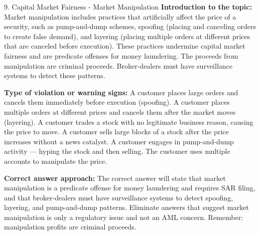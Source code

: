 \documentclass[11pt,a4paper]{beamer}
\begin{document}
\begin{frame}{9. Capital Market Fairness - Market Manipulation}
\tiny
\noindent\textbf{Introduction to the topic:} Market manipulation includes practices that artificially affect the price of a security, such as pump-and-dump schemes, spoofing (placing and canceling orders to create false demand), and layering (placing multiple orders at different prices that are canceled before execution). These practices undermine capital market fairness and are predicate offenses for money laundering. The proceeds from manipulation are criminal proceeds. Broker-dealers must have surveillance systems to detect these patterns.

\vspace{0.1cm}
\noindent\textbf{Type of violation or warning signs:} A customer places large orders and cancels them immediately before execution (spoofing). A customer places multiple orders at different prices and cancels them after the market moves (layering). A customer trades a stock with no legitimate business reason, causing the price to move. A customer sells large blocks of a stock after the price increases without a news catalyst. A customer engages in pump-and-dump activity — hyping the stock and then selling. The customer uses multiple accounts to manipulate the price.

\vspace{0.1cm}
\noindent\textbf{Correct answer approach:} The correct answer will state that market manipulation is a predicate offense for money laundering and requires SAR filing, and that broker-dealers must have surveillance systems to detect spoofing, layering, and pump-and-dump patterns. Eliminate answers that suggest market manipulation is only a regulatory issue and not an AML concern. Remember: manipulation profits are criminal proceeds.
\end{frame}
\end{document}
